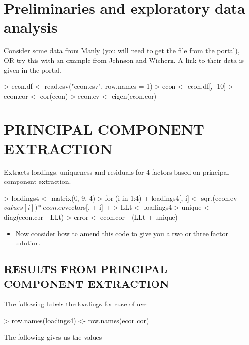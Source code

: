 

\section{Preliminaries and exploratory data analysis}

Consider some data from Manly (you will need to get the file from the portal), OR try this with an example from Johnson and Wichern.   A link to their data is given in the portal.

\begin{Schunk}
\begin{Sinput}
> econ.df <- read.csv("econ.csv", row.names = 1)
> econ <- econ.df[, -10]
> econ.cor <- cor(econ)
> econ.ev <- eigen(econ.cor)
\end{Sinput}
\end{Schunk}

\section{PRINCIPAL COMPONENT EXTRACTION}

Extracts loadings, uniqueness and residuals for 4 factors based on principal component extraction.

\begin{Schunk}
\begin{Sinput}
> loadings4 <- matrix(0, 9, 4)
> for (i in 1:4) {
+     loadings4[, i] <- sqrt(econ.ev$values[i]) * econ.ev$vectors[, 
+         i]
+ }
> LLt <- loadings4 %*% t(loadings4)
> unique <- diag(econ.cor - LLt)
> error <- econ.cor - (LLt + unique)
\end{Sinput}
\end{Schunk}

\begin{itemize}
  \item Now consider how to amend this code to give you a two or three factor solution.
\end{itemize}
    
    
\subsection{RESULTS FROM PRINCIPAL COMPONENT EXTRACTION}

The following labels the loadings for ease of use

\begin{Schunk}
\begin{Sinput}
> row.names(loadings4) <- row.names(econ.cor)
\end{Sinput}
\end{Schunk}
The following gives us the values


